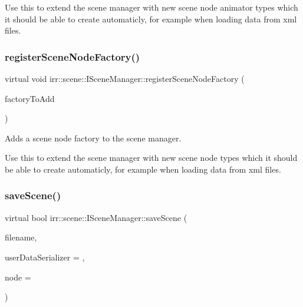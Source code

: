 Use this to extend the scene manager with new scene node animator types which it should be able to create automaticly, for example when loading data from xml files. \mbox{\label{classirr_1_1scene_1_1ISceneManager_a75ac9315def74ae5e26a2d6a2f5a38e9}} 
\subsubsection{\texorpdfstring{register\+Scene\+Node\+Factory()}{registerSceneNodeFactory()}}
{\footnotesize\ttfamily virtual void irr\+::scene\+::\+I\+Scene\+Manager\+::register\+Scene\+Node\+Factory (\begin{DoxyParamCaption}\item[{\hyperlink{classirr_1_1scene_1_1ISceneNodeFactory}{I\+Scene\+Node\+Factory} $\ast$}]{factory\+To\+Add }\end{DoxyParamCaption})\hspace{0.3cm}{\ttfamily [pure virtual]}}



Adds a scene node factory to the scene manager. 

Use this to extend the scene manager with new scene node types which it should be able to create automaticly, for example when loading data from xml files. \mbox{\label{classirr_1_1scene_1_1ISceneManager_a6dd059e96ff4f7233b7ba1ed7e39c337}} 
\subsubsection{\texorpdfstring{save\+Scene()}{saveScene()}\hspace{0.1cm}{\footnotesize\ttfamily [1/3]}}
{\footnotesize\ttfamily virtual bool irr\+::scene\+::\+I\+Scene\+Manager\+::save\+Scene (\begin{DoxyParamCaption}\item[{const \hyperlink{namespaceirr_1_1io_ab1bdc45edb3f94d8319c02bc0f840ee1}{io\+::path} \&}]{filename,  }\item[{\hyperlink{classirr_1_1scene_1_1ISceneUserDataSerializer}{I\+Scene\+User\+Data\+Serializer} $\ast$}]{user\+Data\+Serializer = {},  }\item[{\hyperlink{classirr_1_1scene_1_1ISceneNode}{I\+Scene\+Node} $\ast$}]{node = {} }\end{DoxyParamCaption})\hspace{0.3cm}{\ttfamily [pure virtual]}}



